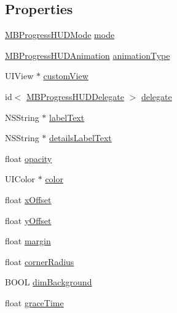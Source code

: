 \subsection*{Properties}
\begin{DoxyCompactItemize}
\item 
\hyperlink{_m_b_progress_h_u_d_8h_a553b6bab1602fa03257edde8491bb621}{M\+B\+Progress\+H\+U\+D\+Mode} \hyperlink{interface_m_b_progress_h_u_d_ace77eaaf507e86fe56436f7ee7b6fdc9}{mode}
\item 
\hyperlink{_m_b_progress_h_u_d_8h_a892ebf586d23b21a74bc54138ca25990}{M\+B\+Progress\+H\+U\+D\+Animation} \hyperlink{interface_m_b_progress_h_u_d_a71d04bb9e2839df9377ad10d03b2e468}{animation\+Type}
\item 
U\+I\+View $\ast$ \hyperlink{interface_m_b_progress_h_u_d_a78f89e05d797a46bf9b41a5dfd1f5d4a}{custom\+View}
\item 
id$<$ \hyperlink{protocol_m_b_progress_h_u_d_delegate-p}{M\+B\+Progress\+H\+U\+D\+Delegate} $>$ \hyperlink{interface_m_b_progress_h_u_d_ad6fee32939fa55fc1a341aba117aa28f}{delegate}
\item 
N\+S\+String $\ast$ \hyperlink{interface_m_b_progress_h_u_d_a531706887f08881c7f13b4309521b299}{label\+Text}
\item 
N\+S\+String $\ast$ \hyperlink{interface_m_b_progress_h_u_d_a8b7cbf551fc551c64159b7a3f648c6ac}{details\+Label\+Text}
\item 
float \hyperlink{interface_m_b_progress_h_u_d_a24ab5e37917e3489d6add081324a49ff}{opacity}
\item 
U\+I\+Color $\ast$ \hyperlink{interface_m_b_progress_h_u_d_a1f4ab0f3ddc52af9353a4cf225ad1361}{color}
\item 
float \hyperlink{interface_m_b_progress_h_u_d_a4e6ee114c04b90ced1a253a6d33ba785}{x\+Offset}
\item 
float \hyperlink{interface_m_b_progress_h_u_d_ad526ffcabab5131697eb0850c50ab1f4}{y\+Offset}
\item 
float \hyperlink{interface_m_b_progress_h_u_d_a4126e72234f8afcb87905a9ed65c022c}{margin}
\item 
float \hyperlink{interface_m_b_progress_h_u_d_a8a3573dbf4dcdeeb187a08d0070e811c}{corner\+Radius}
\item 
B\+O\+O\+L \hyperlink{interface_m_b_progress_h_u_d_ab781ccd4428c8eff6907d2cdc90fc3ee}{dim\+Background}
\item 
float \hyperlink{interface_m_b_progress_h_u_d_a6f837c351a405d0bb6ec05856d7776dd}{grace\+Time}
\item 

\end{DoxyCompactItemize}
